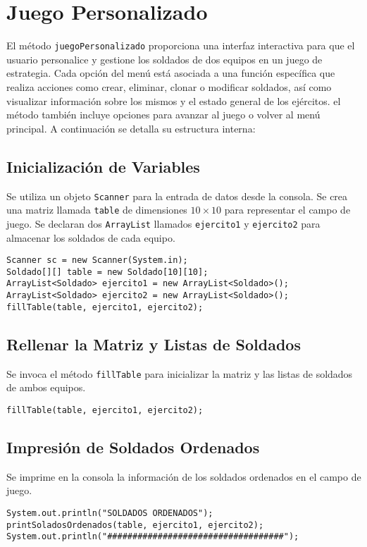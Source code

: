 \section{Juego Personalizado}
El método \texttt{juegoPersonalizado} proporciona una interfaz interactiva para que el usuario personalice y gestione los soldados de dos equipos en un juego de estrategia. Cada opción del menú está asociada a una función específica que realiza acciones como crear, eliminar, clonar o modificar soldados, así como visualizar información sobre los mismos y el estado general de los ejércitos. el método también incluye opciones para avanzar al juego o volver al menú principal.
A continuación se detalla su estructura interna:


\subsection{Inicialización de Variables}
Se utiliza un objeto \texttt{Scanner} para la entrada de datos desde la consola. Se crea una matriz llamada \texttt{table} de dimensiones $10 \times 10$ para representar el campo de juego. Se declaran dos \texttt{ArrayList} llamados \texttt{ejercito1} y \texttt{ejercito2} para almacenar los soldados de cada equipo.
\begin{lstlisting}
Scanner sc = new Scanner(System.in);
Soldado[][] table = new Soldado[10][10];
ArrayList<Soldado> ejercito1 = new ArrayList<Soldado>();
ArrayList<Soldado> ejercito2 = new ArrayList<Soldado>();
fillTable(table, ejercito1, ejercito2);
\end{lstlisting}

\subsection{Rellenar la Matriz y Listas de Soldados}
Se invoca el método \texttt{fillTable} para inicializar la matriz y las listas de soldados de ambos equipos.
\begin{lstlisting}
fillTable(table, ejercito1, ejercito2);
\end{lstlisting}

\subsection{Impresión de Soldados Ordenados}
Se imprime en la consola la información de los soldados ordenados en el campo de juego.
\begin{lstlisting}
System.out.println("SOLDADOS ORDENADOS");
printSoladosOrdenados(table, ejercito1, ejercito2);
System.out.println("###################################");
\end{lstlisting}

